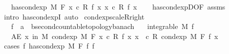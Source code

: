 \begin{isabellebody}
\ \ \ {\isachardoublequoteopen}has{\isacharunderscore}{\kern0pt}cond{\isacharunderscore}{\kern0pt}exp\ M\ F\ {\isacharparenleft}{\kern0pt}{\isasymlambda}x{\isachardot}{\kern0pt}\ c\ {\isacharasterisk}{\kern0pt}\isactrlsub R\ f\ x{\isacharparenright}{\kern0pt}\ {\isacharparenleft}{\kern0pt}{\isasymlambda}x{\isachardot}{\kern0pt}\ c\ {\isacharasterisk}{\kern0pt}\isactrlsub R\ f{\isacharprime}{\kern0pt}\ x{\isacharparenright}{\kern0pt}{\isachardoublequoteclose}\isanewline
%
\isadelimproof
\ \ %
\endisadelimproof
%
\isatagproof
{}\isamarkupfalse%
\ has{\isacharunderscore}{\kern0pt}cond{\isacharunderscore}{\kern0pt}expD{\isacharbrackleft}{\kern0pt}OF\ assms{\isacharbrackright}{\kern0pt}\ \isamarkupfalse%
\ {\isacharparenleft}{\kern0pt}intro\ has{\isacharunderscore}{\kern0pt}cond{\isacharunderscore}{\kern0pt}expI{\isacharprime}{\kern0pt}{\isacharcomma}{\kern0pt}\ auto{\isacharparenright}{\kern0pt}%
\endisatagproof
{\isafoldproof}%
%
\isadelimproof
\isanewline
%
\endisadelimproof
\isanewline
{}\isamarkupfalse%
\ cond{\isacharunderscore}{\kern0pt}exp{\isacharunderscore}{\kern0pt}scaleR{\isacharunderscore}{\kern0pt}right{\isacharcolon}{\kern0pt}\isanewline
\ \ \ f\ {\isacharcolon}{\kern0pt}{\isacharcolon}{\kern0pt}\ {\isachardoublequoteopen}{\isacharprime}{\kern0pt}a\ {\isasymRightarrow}\ {\isacharprime}{\kern0pt}b{\isacharcolon}{\kern0pt}{\isacharcolon}{\kern0pt}{\isacharbraceleft}{\kern0pt}second{\isacharunderscore}{\kern0pt}countable{\isacharunderscore}{\kern0pt}topology{\isacharcomma}{\kern0pt}banach{\isacharbraceright}{\kern0pt}{\isachardoublequoteclose}\isanewline
\ \ \ {\isachardoublequoteopen}integrable\ M\ f{\isachardoublequoteclose}\isanewline
\ \ \ {\isachardoublequoteopen}AE\ x\ in\ M{\isachardot}{\kern0pt}\ cond{\isacharunderscore}{\kern0pt}exp\ M\ F\ {\isacharparenleft}{\kern0pt}{\isasymlambda}x{\isachardot}{\kern0pt}\ c\ {\isacharasterisk}{\kern0pt}\isactrlsub R\ f\ x{\isacharparenright}{\kern0pt}\ x\ {\isacharequal}{\kern0pt}\ c\ {\isacharasterisk}{\kern0pt}\isactrlsub R\ cond{\isacharunderscore}{\kern0pt}exp\ M\ F\ f\ x{\isachardoublequoteclose}\isanewline
%
\isadelimproof
%
\endisadelimproof
%
\isatagproof
{}\isamarkupfalse%
\ {\isacharparenleft}{\kern0pt}cases\ {\isachardoublequoteopen}{\isasymexists}f{\isacharprime}{\kern0pt}{\isachardot}{\kern0pt}\ has{\isacharunderscore}{\kern0pt}cond{\isacharunderscore}{\kern0pt}exp\ M\ F\ f\ f{\isacharprime}{\kern0pt}{\isachardoublequoteclose}{\isacharparenright}{\kern0pt}\isanewline

\end{isabellebody}
